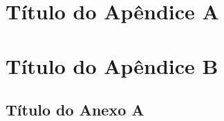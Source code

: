 \documentclass[
  12pt,
  openany,   %
  oneside,   %
  a4paper,
  english, brazil, sumario=tradicional
]{abntex2}
\newif\ifprojeto
\newif\ifcapitulado
\begin{document}
\chapter{\titCronograma}
\label{cap:cronograma}


\chapter{\titResultados}
\label{cap:resultados}


\chapter{\titExemplos}
\label{cap:exemplos}


\ifprojeto\else
  \chapter{\titConclusao}
  \label{cap:conclusao}
  
\fi

\fi %

\postextual



\begin{apendicesenv}
  \partapendices

  \chapter{Título do Apêndice A}
  \label{apend:a}
  

  \chapter{Título do Apêndice B}
  \label{apend:b}
  
\end{apendicesenv}

\begin{anexosenv}
  \partanexos

  \chapter{Título do Anexo A}
  \label{anex:a}
  
\end{anexosenv}
\end{document}
